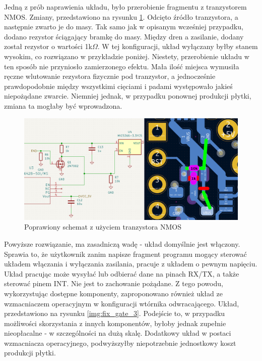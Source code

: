 Jedną z prób naprawienia układu, było przerobienie fragmentu z tranzystorem NMOS. Zmiany, przedstawiono na rysunku \ref{img:fix_gate_2}. Odcięto źródło tranzystora, a następnie zwarto je do masy. Tak samo jak w opisanym wcześniej przypadku, dodano rezystor ściągający bramkę do masy. Między dren a zasilanie, dodany został rezystor o wartości 1k$\Omega$. W tej konfiguracji, układ wyłączany byłby stanem wysokim, co rozwiązano w przykładzie poniżej. Niestety, przerobienie układu w ten sposób nie przyniosło zamierzonego efektu. Mała ilość miejsca wymusiła ręczne wlutowanie rezystora fizycznie pod tranzystor, a jednocześnie prawdopodobnie między wszystkimi cięciami i padami występowało jakieś niepożądane zwarcie. Niemniej jednak, w przypadku ponownej produkcji płytki, zmiana ta mogłaby być wprowadzona.
\begin{figure}[H]
    \centering
    \includegraphics[width=\textwidth, height=\textheight, keepaspectratio]{Graphics/fix_gate_2.png}
    \caption{Poprawiony schemat z użyciem tranzystora NMOS}
    \label{img:fix_gate_2}
\end{figure}
Powyższe rozwiązanie, ma zasadniczą wadę - układ domyślnie jest włączony. Sprawia to, że użytkownik zanim napisze fragment programu mogący sterować układem włączania i wyłączania zasilania, pracuje z układem o pewnym napięciu. Układ pracując może wysyłać lub odbierać dane na pinach RX/TX, a także sterować pinem INT. Nie jest to zachowanie pożądane. Z tego powodu, wykorzystując dostępne komponenty, zaproponowano również układ ze wzmacniaczem operacyjnym w konfiguracji wtórnika odwracającego. Układ, przedstawiono na rysunku \ref{img:fix_gate_3}. Podejście to, w przypadku możliwości skorzystania z innych komponentów, byłoby jednak zupełnie nieopłacalne - w szczególności na dużą skalę. Dodatkowy układ w postaci wzmacniacza operacyjnego, podwyższyłby niepotrzebnie jednostkowy koszt produkcji płytki.

